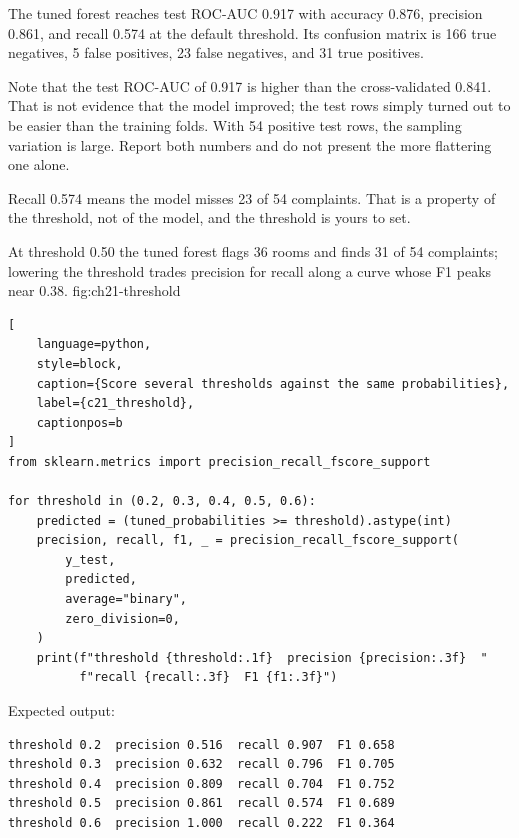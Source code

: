 The tuned forest reaches test ROC-AUC 0.917 with accuracy 0.876, precision
0.861, and recall 0.574 at the default threshold. Its confusion matrix is 166
true negatives, 5 false positives, 23 false negatives, and 31 true positives.

Note that the test ROC-AUC of 0.917 is higher than the cross-validated 0.841.
That is not evidence that the model improved; the test rows simply turned out to
be easier than the training folds. With 54 positive test rows, the sampling
variation is large. Report both numbers and do not present the more flattering
one alone.

\label{sec:c21-threshold}

Recall 0.574 means the model misses 23 of 54 complaints. That is a property of
the threshold, not of the model, and the threshold is yours to set.

{At threshold 0.50 the tuned forest flags 36 rooms and finds 31 of 54 complaints; lowering the threshold trades precision for recall along a curve whose F1 peaks near 0.38.}
{fig:ch21-threshold}

\begin{lstlisting}[
    language=python,
    style=block,
    caption={Score several thresholds against the same probabilities},
    label={c21_threshold},
    captionpos=b
]
from sklearn.metrics import precision_recall_fscore_support

for threshold in (0.2, 0.3, 0.4, 0.5, 0.6):
    predicted = (tuned_probabilities >= threshold).astype(int)
    precision, recall, f1, _ = precision_recall_fscore_support(
        y_test,
        predicted,
        average="binary",
        zero_division=0,
    )
    print(f"threshold {threshold:.1f}  precision {precision:.3f}  "
          f"recall {recall:.3f}  F1 {f1:.3f}")
\end{lstlisting}

Expected output:

\begin{lstlisting}[language=text, style=block, caption={One model, five classifiers}, label={c21_threshold_output}, captionpos=b]
threshold 0.2  precision 0.516  recall 0.907  F1 0.658
threshold 0.3  precision 0.632  recall 0.796  F1 0.705
threshold 0.4  precision 0.809  recall 0.704  F1 0.752
threshold 0.5  precision 0.861  recall 0.574  F1 0.689
threshold 0.6  precision 1.000  recall 0.222  F1 0.364
\end{lstlisting}

